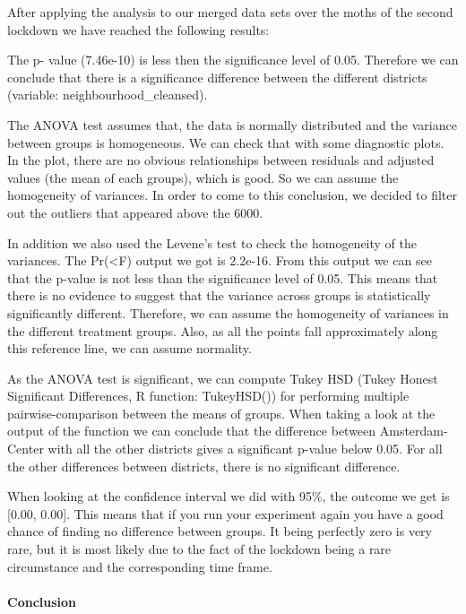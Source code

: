 \documentclass[
]{article}
\begin{document}
After applying the analysis to our merged data sets over the moths of
the second lockdown we have reached the following results:

The p- value (7.46e-10) is less then the significance level of 0.05.
Therefore we can conclude that there is a significance difference
between the different districts (variable: neighbourhood\_cleansed).

The ANOVA test assumes that, the data is normally distributed and the
variance between groups is homogeneous. We can check that with some
diagnostic plots. In the plot, there are no obvious relationships
between residuals and adjusted values (the mean of each groups), which
is good. So we can assume the homogeneity of variances. In order to come
to this conclusion, we decided to filter out the outliers that appeared
above the 6000.

In addition we also used the Levene's test to check the homogeneity of
the variances. The Pr(\textless F) output we got is 2.2e-16. From this
output we can see that the p-value is not less than the significance
level of 0.05. This means that there is no evidence to suggest that the
variance across groups is statistically significantly different.
Therefore, we can assume the homogeneity of variances in the different
treatment groups. Also, as all the points fall approximately along this
reference line, we can assume normality.

As the ANOVA test is significant, we can compute Tukey HSD (Tukey Honest
Significant Differences, R function: TukeyHSD()) for performing multiple
pairwise-comparison between the means of groups. When taking a look at
the output of the function we can conclude that the difference between
Amsterdam- Center with all the other districts gives a significant
p-value below 0.05. For all the other differences between districts,
there is no significant difference.

When looking at the confidence interval we did with 95\%, the outcome we
get is {[}0.00, 0.00{]}. This means that if you run your experiment
again you have a good chance of finding no difference between groups. It
being perfectly zero is very rare, but it is most likely due to the fact
of the lockdown being a rare circumstance and the corresponding time
frame.

\hypertarget{conclusion}{%
\paragraph{Conclusion}\label{conclusion}}
\end{document}
